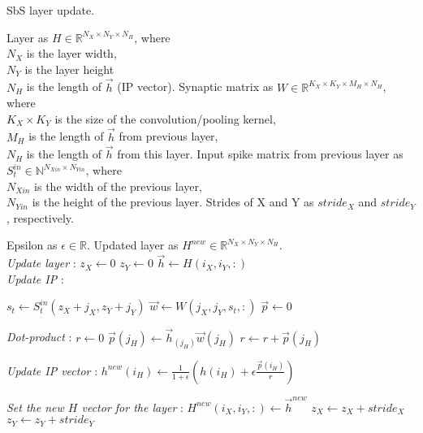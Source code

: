 \begin{algorithm}[h!]
	\label{alg:update}
	\caption{SbS layer update.}
	
	\begin{algorithmic}[1]
		\SetAlgoLined
		\renewcommand{\algorithmicrequire}{\textbf{input:}}
		\renewcommand{\algorithmicensure}{\textbf{output:}}
		\REQUIRE Layer as $H\in\mathbb{R}^{N_X \times N_Y \times N_H}$, where\\
		$N_X$ is the layer width,\\
		$N_Y$ is the layer height\\
		$N_H$ is the length of $\vec{h}$ (IP vector).
		\REQUIRE Synaptic matrix as $W\in\mathbb{R}^{K_X \times K_Y \times M_H\times N_H}$, where\\
		$K_X \times K_Y$ is the size of the convolution/pooling kernel, \\
		$M_H$ is the length of $\vec{h}$ from previous layer,\\
		$N_H$ is the length of $\vec{h}$ from this layer.  
		\REQUIRE Input spike matrix from previous layer as $S_t^{in} \in\mathbb{N}^{N_{Xin} \times N_{Yin}}$, where\\
		$N_{Xin}$ is the width of the previous layer,\\
		$N_{Yin}$ is the height of the previous layer.
		\REQUIRE Strides of X and Y as $stride_{X}$ and $stride_{Y}$, respectively.
		
		\REQUIRE Epsilon as $\epsilon\in\mathbb{R}$.
		\ENSURE Updated layer as $H^{new}\in\mathbb{R}^{N_X \times N_Y \times N_H}$.
		\\
		\textit{Update layer} :
		\STATE $z_{X} \leftarrow 0$ 
		\STATE $z_{Y} \leftarrow 0$
				\STATE $\vec{h} \leftarrow H(i_X, i_Y,:)$\\
				
				\textit{Update IP} :
				
					\STATE $s_t \leftarrow S_t^{in}(z_{X}+j_X,z_{Y}+j_Y)$
					\STATE $\vec{w} \leftarrow W(j_X,j_Y,s_t,:)$
					\STATE $\vec{p} \leftarrow 0$
					
					\textit{Dot-product} :
					\STATE $r \leftarrow 0$
						\STATE $\vec{p}(j_H) \leftarrow \vec{h}_(j_H)\vec{w}(j_H)$
						\STATE $r \leftarrow r + \vec{p}(j_H)$
					\ENDFOR
					
					
						\textit{Update IP vector} :
						\STATE
						$  h^{new}(i_H) \leftarrow \frac{1}{1+\epsilon} \left(h(i_H) + \epsilon \frac{\vec{p}(i_H) }{r} \right) $
						\ENDFOR
		
						\textit{Set the new $H$ vector for the layer} :
						\STATE $H^{new}(i_X,i_Y,:) \leftarrow \vec{h}^{new}$
					\ENDIF
				\ENDFOR
				\STATE $z_{X} \leftarrow z_{X} + stride_{X}$
				\ENDFOR
				\STATE $z_{Y} \leftarrow z_{Y} + stride_{Y}$
		\ENDFOR
		
	\end{algorithmic} 
\end{algorithm}


